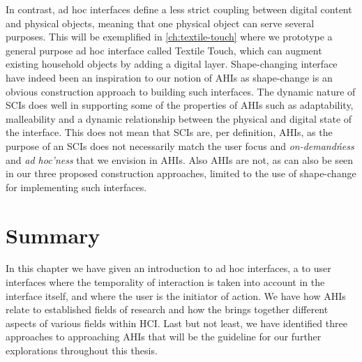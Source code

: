 In contrast, ad hoc interfaces define a less strict coupling between digital content and physical objects, meaning that one physical object can serve several purposes.
This will be exemplified in \autoref{ch:textile-touch} where we prototype a general purpose ad hoc interface called Textile Touch, which can augment existing household objects by adding a digital layer. 
\blank
Shape-changing interface have indeed been an inspiration to our notion of AHIs as shape-change is an obvious construction approach to building such interfaces.
The dynamic nature of SCIs does well in supporting some of the properties of AHIs such as adaptability, malleability and a dynamic relationship between the physical and digital state of the interface.
This does not mean that SCIs are, per definition, AHIs, as the purpose of an SCIs does not necessarily match the user focus and \emph{on-demand\'ness} and \emph{ad hoc'ness} that we envision in AHIs.
Also AHIs are not, as can also be seen in our three proposed construction approaches, limited to the use of shape-change for implementing such interfaces. 

\section{Summary}

In this chapter we have given an introduction to ad hoc interfaces, a  to user interfaces where the temporality of interaction is taken into account in the interface itself, and where the user is the initiator of action.
We have  how AHIs relate to established fields of research and how the  brings together different aspects of various fields within HCI.
Last but not least, we have identified three approaches to approaching AHIs that will be the guideline for our further explorations throughout this thesis.
